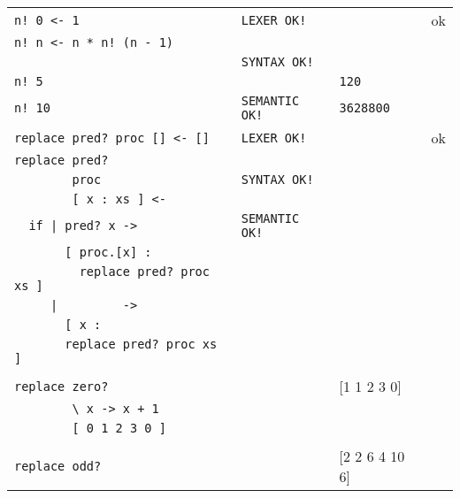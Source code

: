 \begin{longtable}[ht!]{|l|l|l|c|}
            \verb,n! 0 <- 1,                & \verb,LEXER OK!,   &                 & ok \\
            \verb,n! n <- n * n! (n - 1),   &                    &                 & \\
                                            & \verb,SYNTAX OK!,  &                 & \\
            \verb,n! 5,                     &                    & \verb,120,      & \\
            \verb,n! 10,                    & \verb,SEMANTIC OK!,& \verb,3628800,  & \\ \hline

            \pagebreak
        
            \verb,replace pred? proc [] <- [],& \verb,LEXER OK!,   & & ok \\
            \verb,replace pred?,              &                    & & \\
            \verb,        proc ,              & \verb,SYNTAX OK!,  & & \\
            \verb,        [ x : xs ] <-,      &                    & & \\
            \verb,  if | pred? x ->,          & \verb,SEMANTIC OK!,& & \\
            \verb,       [ proc.[x] :,        &                    & & \\
            \verb,         replace pred? proc xs ], &                    & & \\
            \verb,     |         -> ,               &                    & & \\
            \verb,       [ x :,                     &                    & & \\
            \verb,       replace pred? proc xs ],   &                    & & \\  
                                                &                    & & \\
            \verb,replace zero?,                &                    & [1 1 2 3 0] & \\
            \verb,        \ x -> x + 1,         &                    & & \\
            \verb,        [ 0 1 2 3 0 ],        &                    & & \\
                                                &                    & & \\
            \verb,replace odd?,                 &                    & [2 2 6 4 10 6] & \\

\end{longtable}
